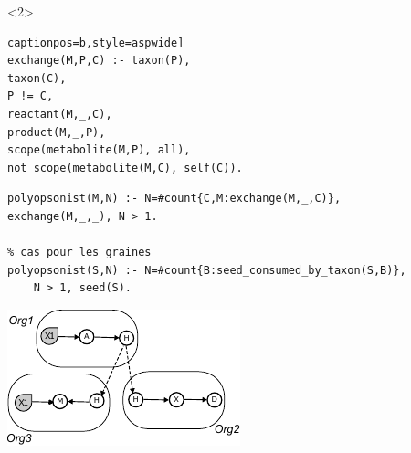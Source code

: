 \documentclass[8pt,usenames,dvipsnames]{beamer}
\begin{document}
\begin{frame}[fragile]
\begin{onlyenv}
\begin{minipage}{0.45\textwidth}
\end{minipage}
\end{onlyenv}

\begin{onlyenv}<2>
\begin{minipage}{0.5\textwidth}
\begin{lstlisting}[mathescape=True, label={lst:echange}] captionpos=b,style=aspwide]
exchange(M,P,C) :- taxon(P),
taxon(C),
P != C,
reactant(M,_,C),
product(M,_,P),
scope(metabolite(M,P), all),
not scope(metabolite(M,C), self(C)).
\end{lstlisting}
\begin{lstlisting}[mathescape=True,label={lst:competition}, captionpos=b]
% cas pour les metabolites echangeables
polyopsonist(M,N) :- N=#count{C,M:exchange(M,_,C)},
exchange(M,_,_), N > 1.
		 	
% cas pour les graines
polyopsonist(S,N) :- N=#count{B:seed_consumed_by_taxon(S,B)}, 
	N > 1, seed(S).
\end{lstlisting}
\end{minipage}%
\hspace{0.25cm}
\hfill
\begin{minipage}{0.45\textwidth}
\includegraphics[width=\textwidth]{figures/exchanged.pdf}
\end{minipage}
\end{onlyenv}
\end{frame}
\end{document}
